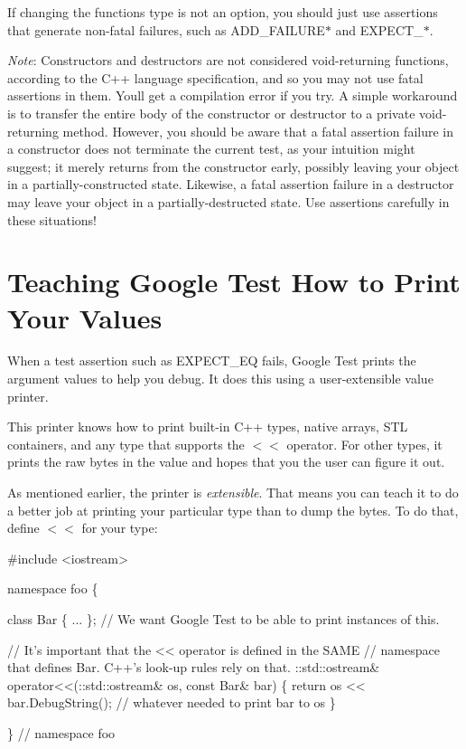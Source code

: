 If changing the function\textquotesingle{}s type is not an option, you should just use assertions that generate non-\/fatal failures, such as {\ttfamily A\+D\+D\+\_\+\+F\+A\+I\+L\+U\+R\+E$\ast$} and {\ttfamily E\+X\+P\+E\+C\+T\+\_\+$\ast$}.

{\itshape Note}\+: Constructors and destructors are not considered void-\/returning functions, according to the C++ language specification, and so you may not use fatal assertions in them. You\textquotesingle{}ll get a compilation error if you try. A simple workaround is to transfer the entire body of the constructor or destructor to a private void-\/returning method. However, you should be aware that a fatal assertion failure in a constructor does not terminate the current test, as your intuition might suggest; it merely returns from the constructor early, possibly leaving your object in a partially-\/constructed state. Likewise, a fatal assertion failure in a destructor may leave your object in a partially-\/destructed state. Use assertions carefully in these situations!

\section*{Teaching Google Test How to Print Your Values}

When a test assertion such as {\ttfamily E\+X\+P\+E\+C\+T\+\_\+\+EQ} fails, Google Test prints the argument values to help you debug. It does this using a user-\/extensible value printer.

This printer knows how to print built-\/in C++ types, native arrays, S\+TL containers, and any type that supports the {\ttfamily $<$$<$} operator. For other types, it prints the raw bytes in the value and hopes that you the user can figure it out.

As mentioned earlier, the printer is {\itshape extensible}. That means you can teach it to do a better job at printing your particular type than to dump the bytes. To do that, define {\ttfamily $<$$<$} for your type\+:


\begin{DoxyCode}
#include <iostream>

namespace foo \{

class Bar \{ ... \};  // We want Google Test to be able to print instances of this.

// It's important that the << operator is defined in the SAME
// namespace that defines Bar.  C++'s look-up rules rely on that.
::std::ostream& operator<<(::std::ostream& os, const Bar& bar) \{
  return os << bar.DebugString();  // whatever needed to print bar to os
\}

\}  // namespace foo
\end{DoxyCode}


